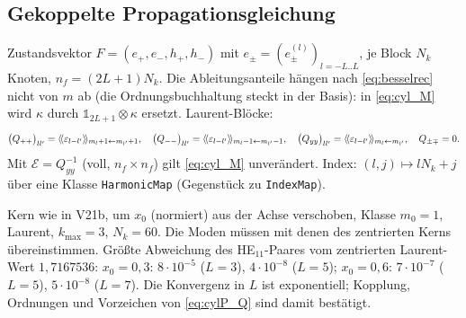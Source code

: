 \subsection{Gekoppelte Propagationsgleichung}
Zustandsvektor $F=(e_+,e_-,h_+,h_-)$ mit $e_\pm=(e^{(l)}_\pm)_{l=-L..L}$, je Block $N_k$ Knoten, $n_f=(2L+1)N_k$.
Die Ableitungsanteile hängen nach \eqref{eq:besselrec} nicht von $m$ ab (die Ordnungsbuchhaltung steckt in der Basis):
in \eqref{eq:cyl_M} wird $\kappa$ durch $\mathbb 1_{2L+1}\otimes\kappa$ ersetzt. Laurent-Blöcke:
\begin{equation}
  \big(Q_{++}\big)_{ll'}=\langle\!\langle \varepsilon_{l-l'}\rangle\!\rangle_{m_l+1\leftarrow m_{l'}+1},\quad
  \big(Q_{--}\big)_{ll'}=\langle\!\langle \varepsilon_{l-l'}\rangle\!\rangle_{m_l-1\leftarrow m_{l'}-1},\quad
  \big(Q_{yy}\big)_{ll'}=\langle\!\langle \varepsilon_{l-l'}\rangle\!\rangle_{m_l\leftarrow m_{l'}},\quad Q_{\pm\mp}=0 .
  \label{eq:cylP_Q}
\end{equation}
Mit $\mathcal E=Q_{yy}^{-1}$ (voll, $n_f\times n_f$) gilt \eqref{eq:cyl_M} unverändert. Index: $(l,j)\mapsto lN_k+j$ über eine
Klasse \verb|HarmonicMap| (Gegenstück zu \verb|IndexMap|).
\begin{tcolorbox}[title={Befund Prototyp ($P=1$): exzentrischer Faserkern}]
Kern wie in V21b, um $x_0$ (normiert) aus der Achse verschoben, Klasse $m_0=1$, Laurent, $k_{\max}=3$, $N_k=60$. Die
Moden müssen mit denen des zentrierten Kerns übereinstimmen. Größte Abweichung des HE$_{11}$-Paares vom zentrierten
Laurent-Wert $1{,}7167536$: $x_0=0{,}3$: $8\cdot10^{-5}$ ($L=3$), $4\cdot10^{-8}$ ($L=5$); $x_0=0{,}6$: $7\cdot10^{-7}$
($L=5$), $5\cdot10^{-8}$ ($L=7$). Die Konvergenz in $L$ ist exponentiell; Kopplung, Ordnungen und Vorzeichen von
\eqref{eq:cylP_Q} sind damit bestätigt.
\end{tcolorbox}

